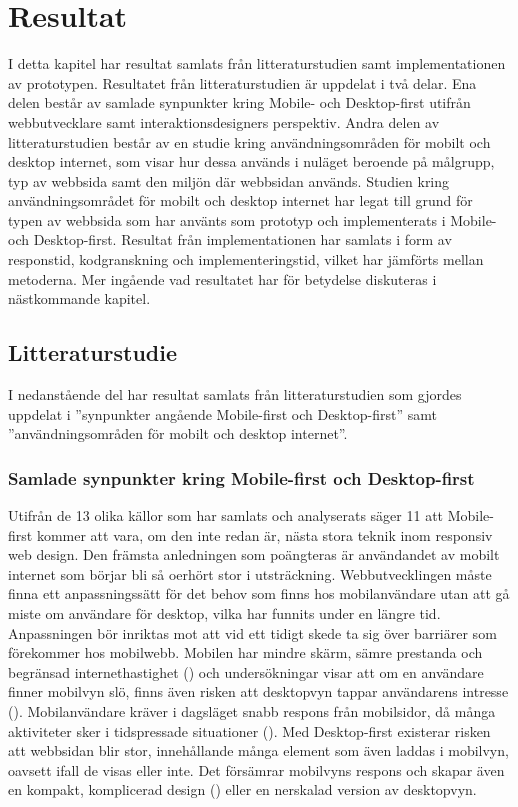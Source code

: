 \documentclass[11pt]{article}
\begin{document}
\newpage

\section{Resultat}

I detta kapitel har resultat samlats från litteraturstudien samt implementationen av prototypen.
Resultatet från litteraturstudien är uppdelat i två delar. Ena delen består av samlade synpunkter kring Mobile- och Desktop-first utifrån webbutvecklare samt interaktionsdesigners perspektiv. Andra delen av litteraturstudien består av en studie kring användningsområden för mobilt och desktop internet, som visar hur dessa används i nuläget beroende på målgrupp, typ av webbsida samt den miljön där webbsidan används. Studien kring användningsområdet för mobilt och desktop internet har legat till grund för typen av webbsida som har använts som prototyp och implementerats i Mobile- och Desktop-first. Resultat från implementationen har samlats i form av responstid, kodgranskning och implementeringstid, vilket har jämförts mellan metoderna. Mer ingående vad resultatet har för betydelse diskuteras i nästkommande kapitel.


\subsection{Litteraturstudie}
I nedanstående del har resultat samlats från litteraturstudien som gjordes uppdelat i ''synpunkter angående Mobile-first och Desktop-first'' samt ''användningsområden för mobilt och desktop internet''.
\subsubsection{Samlade synpunkter kring Mobile-first och Desktop-first}
Utifrån de 13 olika källor som har samlats och analyserats säger 11 att Mobile-first kommer att vara, om den inte redan är, nästa stora teknik inom responsiv web design. Den främsta anledningen som poängteras är användandet av mobilt internet som börjar bli så oerhört stor i utsträckning. Webbutvecklingen måste finna ett anpassningssätt för det behov som finns hos mobilanvändare utan att gå miste om användare för desktop, vilka har funnits under en längre tid. Anpassningen bör inriktas mot att vid ett tidigt skede ta sig över barriärer som förekommer hos mobilwebb. Mobilen har mindre skärm, sämre prestanda och begränsad internethastighet (\cite{themepartner}) och undersökningar visar att om en användare finner mobilvyn slö, finns även risken att desktopvyn tappar användarens intresse (\cite{zurbword}). Mobilanvändare kräver i dagsläget snabb respons från mobilsidor, då många aktiviteter sker i tidspressade situationer (\cite{techradar}). Med Desktop-first existerar risken att webbsidan blir stor, innehållande många element som även laddas i mobilvyn, oavsett ifall de visas eller inte. Det försämrar mobilvyns respons och skapar även en kompakt, komplicerad design (\cite{zurbword}) eller en nerskalad version av desktopvyn.
\end{document}
